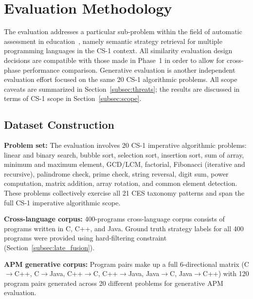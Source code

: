 \section{Evaluation Methodology}
\label{sec:evaluation_setup}

The evaluation addresses a particular sub-problem within the field of automatic assessment in education~\cite{ref_ihantola2010,ref_paiva2022}, namely semantic strategy retrieval for multiple programming languages in the CS-1 context. All similarity evaluation design decisions are compatible with those made in Phase~1 in order to allow for cross-phase performance comparison. Generative evaluation is another independent evaluation effort focused on the same 20 CS-1 algorithmic problems. All scope caveats are summarized in Section~\ref{subsec:threats}; the results are discussed in terms of CS-1 scope in Section~\ref{subsec:scope}.

\subsection{Dataset Construction}
\label{subsec:dataset_construction}

\textbf{Problem set:} The evaluation involves 20 CS-1 imperative algorithmic problems: linear and binary search, bubble sort, selection sort, insertion sort, sum of array, minimum and maximum element, GCD/LCM, factorial, Fibonacci (iterative and recursive), palindrome check, prime check, string reversal, digit sum, power computation, matrix addition, array rotation, and common element detection. These problems collectively exercise all 21 CES taxonomy patterns and span the full CS-1 imperative algorithmic scope.


\textbf{Cross-language corpus:} 400-programs cross-language corpus consists of programs written in C, C++, and Java. Ground truth strategy labels for all 400 programs were provided using hard-filtering constraint (Section~\ref{subsec:late_fusion}).

\textbf{APM generative corpus:} Program pairs make up a full 6-directional matrix (C$\rightarrow$C++, C$\rightarrow$Java, C++$\rightarrow$C, C++$\rightarrow$Java, Java$\rightarrow$C, Java$\rightarrow$C++) with 120 program pairs generated across 20 different problems for generative APM evaluation.

